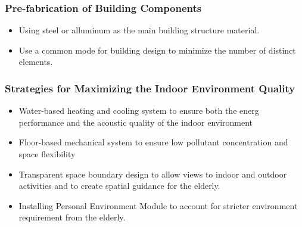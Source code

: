 \subsubsection{Pre-fabrication of Building Components}
\begin{itemize}
\item Using steel or alluminum as the main building structure material.
\item Use a common mode for building design to minimize the number of
  distinct elements.
\end{itemize}
\subsubsection{Strategies for Maximizing the Indoor Environment Quality}
\begin{itemize}
\item Water-based heating and cooling system to ensure both the energ performance and the acoustic quality of the indoor environment 
\item Floor-based mechanical system to ensure low pollutant concentration and space flexibility  
\item Transparent space boundary design to allow views to indoor and outdoor activities and to create spatial guidance for the elderly.
\item Installing Personal Environment Module to account for stricter environment requirement from the elderly.
\end{itemize}
\begin{comment}
\section{Benefit for the Elderly}
\subsection{Fighting Age Segregation}
It creates opportunities for fighting "age segregation", a severe problem in the U.S. life style, and facilitates the integration of different age groups.
\subsection{High Quality Continued Education}
\subsection{Adjacency to Art and Culture}
\subsection{Mobility and Green Lifestyle}
\end{comment}
